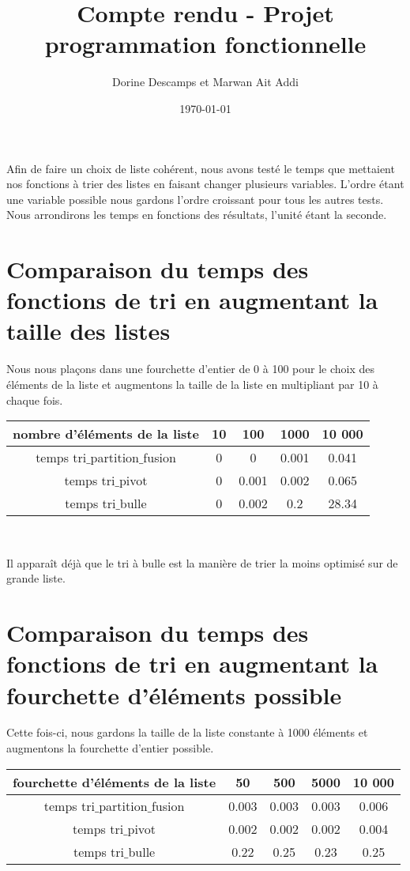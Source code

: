 \documentclass[a4paper, 12pt]{article}
\title{Compte rendu - Projet programmation fonctionnelle}
\author{Dorine Descamps et Marwan Ait Addi}
\date{\today}
\begin{document}
\maketitle
\tableofcontents
\newpage

Afin de faire un choix de liste cohérent, nous avons testé le temps que mettaient nos fonctions à trier des listes en faisant changer plusieurs variables. L'ordre étant une variable possible nous gardons l'ordre croissant pour tous les autres tests. Nous arrondirons les temps en fonctions des résultats, l'unité étant la seconde.

\section{Comparaison du temps des fonctions de tri en augmentant la taille des listes}

Nous nous plaçons dans une fourchette d'entier de 0 à 100 pour le choix des éléments de la liste et augmentons la taille de la liste en multipliant par 10 à chaque fois.\\

\begin{tabular}{|c|c|c|c|c|}
\hline 
nombre d'éléments de la liste & 10 & 100 & 1000 & 10 000 \\ 
\hline 
temps tri$\_$partition$\_$fusion & 0 & 0 &0.001 & 0.041 \\ 
\hline 
temps tri$\_$pivot & 0 & 0.001 & 0.002 & 0.065\\ 
\hline 
temps tri$\_$bulle & 0 & 0.002 & 0.2 & 28.34 \\ 
\hline 
\end{tabular} \\ \newline

Il apparaît déjà que le tri à bulle est la manière de trier la moins optimisé sur de grande liste.

\section{Comparaison du temps des fonctions de tri en augmentant la fourchette d'éléments possible}

Cette fois-ci, nous gardons la taille de la liste constante à 1000 éléments et augmentons la fourchette d'entier possible. \newline 

\begin{tabular}{|c|c|c|c|c|}
\hline 
fourchette d'éléments de la liste & 50 & 500 & 5000 & 10 000 \\ 
\hline 
temps tri$\_$partition$\_$fusion & 0.003 & 0.003 & 0.003& 0.006 \\ 
\hline 
temps tri$\_$pivot & 0.002 & 0.002 & 0.002 & 0.004\\ 
\hline 
temps tri$\_$bulle & 0.22 & 0.25 & 0.23 & 0.25 \\ 
\hline 
\end{tabular} \\ \newline
\end{document}
